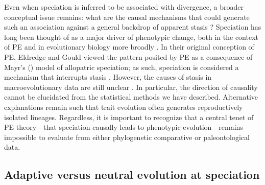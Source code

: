 Even when speciation is inferred to be associated with divergence, a broader conceptual issue remains: what are the causal mechanisms that could generate such an association against a general backdrop of apparent stasis \citep{BentonPearson2001, Eldredge2005}? Speciation has long been thought of as a major driver of phenotypic change, both in the context of PE and in evolutionary biology more broadly \citep{Saetre2013}. In their original conception of PE, Eldredge and Gould \citep{Eldredge1971, EldredgeGould1972} viewed the pattern posited by PE as a consequence of Mayr's (\citeyear{Mayr}) model of allopatric speciation; as such, speciation is considered a mechanism that interrupts stasis \citep{Futuyma1987, Futuyma2010}. However, the causes of stasis in macroevolutionary data are still unclear \citep{HansenHoule2004, EstesArnold2007, WalshBlows2009, Futuyma2010}. In particular, the direction of causality cannot be elucidated from the statistical methods we have described. 
Alternative explanations remain such that trait evolution often generates reproductively isolated lineages.
Regardless, it is important to recognize that a central tenet of PE theory---that speciation causally leads to phenotypic evolution---remains impossible to evaluate from either phylogenetic comparative or paleontological data. 

\subsection{Adaptive versus neutral evolution at speciation}

